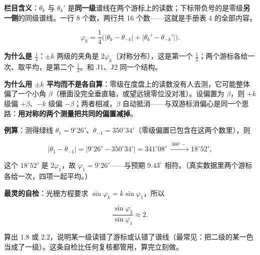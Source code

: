 \textbf{栏目含义}：$\theta_k$ 与 $\theta_k'$ 是\textbf{同一级}谱线在两个游标上的读数；下标带负号的是零级\textbf{另一侧}的同级谱线。一行 8 个数，两行共 16 个数——这就是手册表 4 的全部内容。


\[
\varphi_k=\frac14\bigl(|\theta_k-\theta_{-k}|+|\theta_k'-\theta_{-k}'|\bigr).
\]

\textbf{为什么是 $\tfrac14$}：$\pm k$ 两级的夹角是 $2\varphi_k$（对称分布），这是第一个 $\tfrac12$；两个游标各给一次、取平均，是第二个 $\tfrac12$。和 J1、J2 同一个结构。

\textbf{为什么用 $\pm k$ 平均而不是各自算}：零级在度盘上的读数没有人去测，它可能整体偏了一个小角 $\beta$（栅面没完全垂直轴，或望远镜零位没对准）。设偏置为 $\beta$，则 $+k$ 级偏 $+\beta$、$-k$ 级偏 $-\beta$；两者相减，$\beta$ 自动抵消——与双游标消偏心是同一个思路：\textbf{用对称的两个测量把共同的偏置减掉}。

\textbf{例算}：测得绿线 $\theta_1=9^{\circ}26'$、$\theta_{-1}=350^{\circ}34'$（零级偏置已包含在这两个数里），则

\[
|\theta_1-\theta_{-1}|=|9^{\circ}26'-350^{\circ}34'|=341^{\circ}08'
\ \xrightarrow{\ 360^{\circ}-\ \ }18^{\circ}52',
\]

这个 $18^{\circ}52'$ 是 $2\varphi_1$，故 $\varphi_1=9^{\circ}26'$——与预期 $9.43^{\circ}$ 相符。（真实数据里两个游标各给一次，四项一起平均。）

\textbf{最灵的自检}：光栅方程要求 $\sin\varphi_k=k\sin\varphi_1$，所以

\[
\frac{\sin\varphi_2}{\sin\varphi_1}\approx2 .
\]

算出 $1.8$ 或 $2.2$，说明某一级读错了游标或认错了谱线（最常见：把二级的某一色当成了一级）。这条自检比任何复核都管用，算完立刻做。


